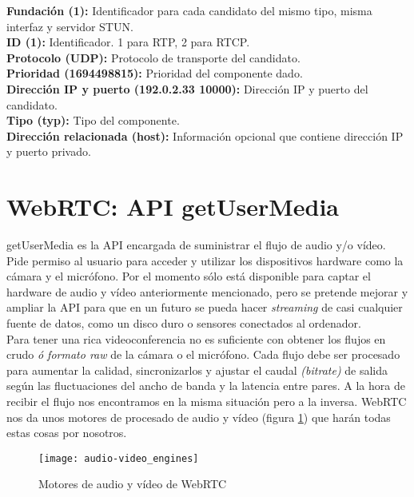 \noindent \textbf{Fundación (1):} Identificador para cada candidato del mismo tipo, misma interfaz y servidor STUN.\\
\textbf{ID (1):} Identificador. 1 para RTP, 2 para RTCP.\\
\textbf{Protocolo (UDP):} Protocolo de transporte del candidato.\\
\textbf{Prioridad (1694498815): }Prioridad del componente dado.\\
\textbf{Dirección IP y puerto (192.0.2.33 10000): }Dirección IP y puerto del candidato.\\
\textbf{Tipo (typ):} Tipo del componente.\\
\textbf{Dirección relacionada (host):} Información opcional que contiene dirección IP y puerto privado.\\


\section{WebRTC: API getUserMedia} 

getUserMedia es la API encargada de suministrar el flujo de audio y/o vídeo. Pide permiso al usuario para acceder y utilizar los dispositivos hardware como la cámara y el micrófono. Por el momento sólo está disponible para captar el hardware de audio y vídeo anteriormente mencionado, pero se pretende mejorar y ampliar la API para que en un futuro se pueda hacer \emph{streaming} de casi cualquier fuente de datos, como un disco duro o sensores conectados al ordenador.\\

Para tener una rica videoconferencia no es suficiente con obtener los flujos en crudo \textit{ó formato raw} de la cámara o el micrófono. Cada flujo debe ser procesado para aumentar la calidad, sincronizarlos y ajustar el caudal \textit{(bitrate)} de salida según las fluctuaciones del ancho de banda y la latencia entre pares. A la hora de recibir el flujo nos encontramos en la misma situación pero a la inversa. WebRTC nos da unos motores de procesado de audio y vídeo (figura \ref{fig:audio-video_engines}) que harán todas estas cosas por nosotros.\\

\begin{figure}[h!]
\centering
\texttt{[image: audio-video\_engines]}
\caption{Motores de audio y vídeo de WebRTC }
\label{fig:audio-video_engines}
\end{figure}

